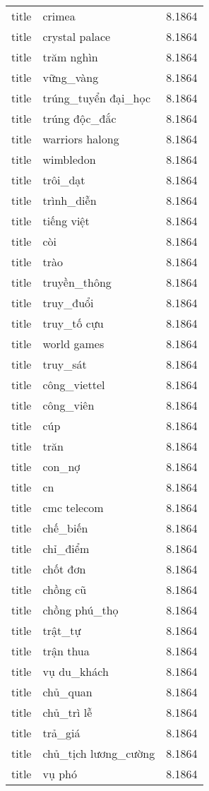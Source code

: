 \documentclass{article}
\begin{document}
\begin{tabular}{lll}
title & crimea & 8.1864\\
title & crystal palace & 8.1864\\
title & trăm nghìn & 8.1864\\
title & vững\_vàng & 8.1864\\
title & trúng\_tuyển đại\_học & 8.1864\\
title & trúng độc\_đắc & 8.1864\\
title & warriors halong & 8.1864\\
title & wimbledon & 8.1864\\
title & trôi\_dạt & 8.1864\\
title & trình\_diễn & 8.1864\\
title & tiếng việt & 8.1864\\
title & còi & 8.1864\\
title & trào & 8.1864\\
title & truyền\_thông & 8.1864\\
title & truy\_đuổi & 8.1864\\
title & truy\_tố cựu & 8.1864\\
title & world games & 8.1864\\
title & truy\_sát & 8.1864\\
title & công\_viettel & 8.1864\\
title & công\_viên & 8.1864\\
title & cúp & 8.1864\\
title & trăn & 8.1864\\
title & con\_nợ & 8.1864\\
title & cn & 8.1864\\
title & cmc telecom & 8.1864\\
title & chế\_biến & 8.1864\\
title & chỉ\_điểm & 8.1864\\
title & chốt đơn & 8.1864\\
title & chồng cũ & 8.1864\\
title & chồng phú\_thọ & 8.1864\\
title & trật\_tự & 8.1864\\
title & trận thua & 8.1864\\
title & vụ du\_khách & 8.1864\\
title & chủ\_quan & 8.1864\\
title & chủ\_trì lễ & 8.1864\\
title & trả\_giá & 8.1864\\
title & chủ\_tịch lương\_cường & 8.1864\\
title & vụ phó & 8.1864\\

\end{tabular}
\end{document}
